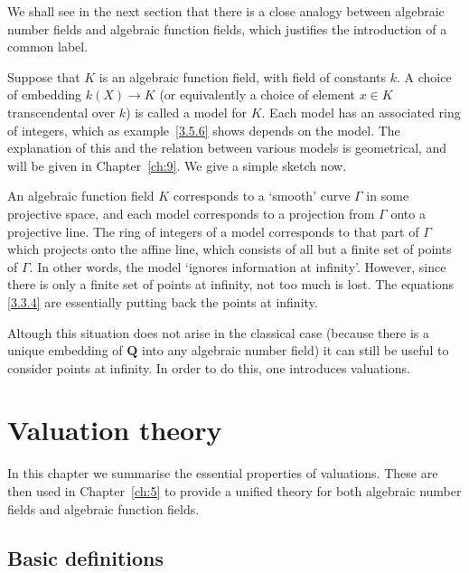 \documentclass[10pt]{article}
\theoremstyle{definition}
\def\QQ{\mathbf{Q}}
\def\qw#1{`#1'}
\begin{document}
We shall see in the next section that there is a close analogy between algebraic number fields and algebraic function fields, which justifies the introduction of a common label.

Suppose that $K$ is an algebraic function field, with field of constants $k$.
A choice of embedding $k(X) \to K$ (or equivalently a choice of element $x \in K$ transcendental over $k$) is called a model for $K$.
Each model has an associated ring of integers, which as example~\ref{3.5.6} shows depends on the model.
The explanation of this and the relation between various models is geometrical, and will be given in Chapter~\ref{ch:9}.
We give a simple sketch now.

\begin{figure}[h]
\end{figure}

An algebraic function field $K$ corresponds to a \qw{smooth} curve $\Gamma$ in some projective space, and each model corresponds to a projection from $\Gamma$ onto a projective line.
The ring of integers of a model corresponds to that part of $\Gamma$ which projects onto the affine line, which consists of all but a finite set of points of $\Gamma$.
In other words, the model \qw{ignores information at infinity}.
However, since there is only a finite set of points at infinity, not too much is lost.
The equations \eqref{3.3.4} are essentially putting back the points at infinity.

Altough this situation does not arise in the classical case (because there is a unique embedding of $\QQ$ into any algebraic number field) it can still be useful to consider points at infinity.
In order to do this, one introduces valuations.



\section{Valuation theory}
\label{ch:4}


In this chapter we summarise the essential properties of valuations.
These are then used in Chapter~\ref{ch:5} to provide a unified theory for both algebraic number fields and algebraic function fields.


\subsection{Basic definitions}
\label{ch:4.1}
\end{document}
